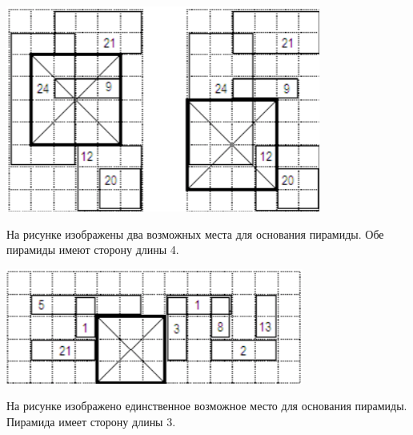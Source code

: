 \includegraphics{pyramid1.png}

На рисунке изображены два возможных места для основания пирамиды. Обе пирамиды имеют
сторону длины 4. 

\includegraphics{pyramid2.png}

На рисунке изображено единственное возможное место для основания пирамиды. Пирамида
имеет сторону длины 3. 